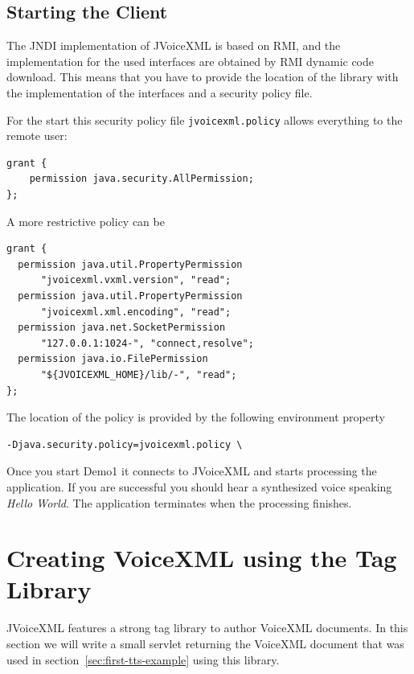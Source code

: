 \documentclass[11pt,a4paper]{article}
\begin{document}
\subsection{Starting the Client}
\label{sec:starting-client}

The JNDI implementation of JVoiceXML is based on RMI, and
the implementation for the used interfaces are obtained by
RMI dynamic code download. This means that you have to provide
the location of the library with the implementation of the
interfaces and a security policy file.

For the start this security policy file \texttt{jvoicexml.policy}
allows everything to the remote user:

\begin{lstlisting}
grant {
    permission java.security.AllPermission;
};
\end{lstlisting}

A more restrictive policy can be

\begin{lstlisting}
grant {
  permission java.util.PropertyPermission
      "jvoicexml.vxml.version", "read";
  permission java.util.PropertyPermission
      "jvoicexml.xml.encoding", "read";
  permission java.net.SocketPermission
      "127.0.0.1:1024-", "connect,resolve";
  permission java.io.FilePermission
      "${JVOICEXML_HOME}/lib/-", "read";
};
\end{lstlisting}

The location of the policy is provided by the following environment property

\begin{lstlisting}
-Djava.security.policy=jvoicexml.policy \
\end{lstlisting}

Once you start Demo1 it connects to JVoiceXML and starts processing
the application. If you are successful you should hear a synthesized voice
speaking \emph{Hello World}. The application terminates when the processing
finishes.

\section{Creating VoiceXML using the Tag Library}

JVoiceXML features a strong tag library to author VoiceXML documents. In
this section we will write a small servlet returning the VoiceXML document that
was used in section~\ref{sec:first-tts-example} using this library.
\end{document}
